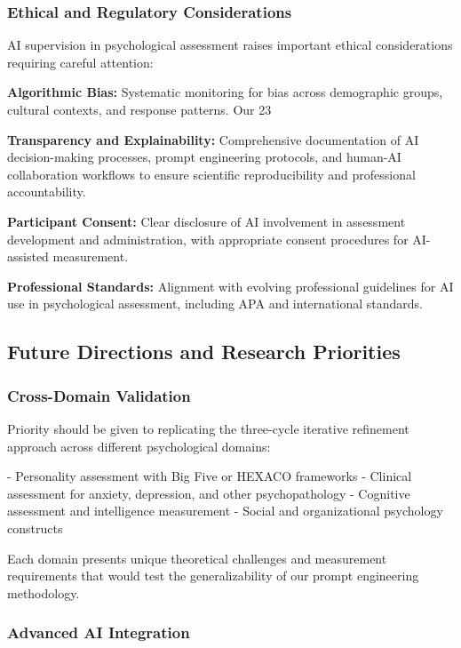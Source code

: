 \documentclass[12pt,a4paper]{article}
\begin{document}
\subsubsection{Ethical and Regulatory Considerations}

AI supervision in psychological assessment raises important ethical considerations requiring careful attention:

\textbf{Algorithmic Bias:} Systematic monitoring for bias across demographic groups, cultural contexts, and response patterns. Our 23%

\textbf{Transparency and Explainability:} Comprehensive documentation of AI decision-making processes, prompt engineering protocols, and human-AI collaboration workflows to ensure scientific reproducibility and professional accountability.

\textbf{Participant Consent:} Clear disclosure of AI involvement in assessment development and administration, with appropriate consent procedures for AI-assisted measurement.

\textbf{Professional Standards:} Alignment with evolving professional guidelines for AI use in psychological assessment, including APA and international standards.

\subsection{Future Directions and Research Priorities}

\subsubsection{Cross-Domain Validation}

Priority should be given to replicating the three-cycle iterative refinement approach across different psychological domains:

- Personality assessment with Big Five or HEXACO frameworks
- Clinical assessment for anxiety, depression, and other psychopathology
- Cognitive assessment and intelligence measurement
- Social and organizational psychology constructs

Each domain presents unique theoretical challenges and measurement requirements that would test the generalizability of our prompt engineering methodology.

\subsubsection{Advanced AI Integration}
\end{document}
